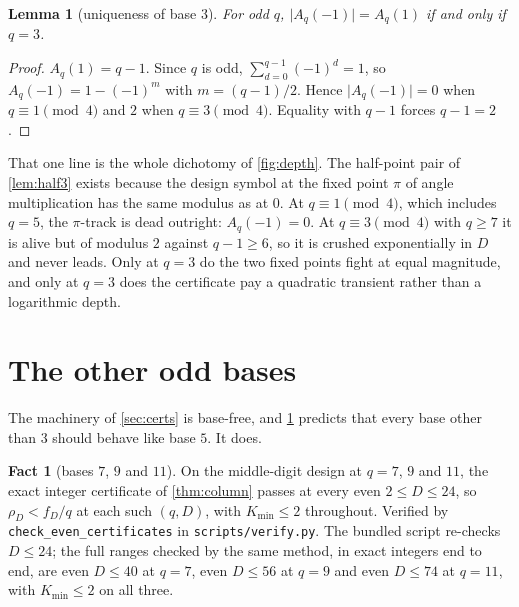 \documentclass[11pt]{amsart}
\newtheorem{lemma}[theorem]{Lemma}
\theoremstyle{definition}
\newtheorem{fact}[theorem]{Fact}
\theoremstyle{remark}
\begin{document}
\begin{lemma}[uniqueness of base $3$]
\label{lem:unique}
For odd $q$, $\lvert A_q(-1)\rvert = A_q(1)$ if and only if $q = 3$.
\end{lemma}

\begin{proof}
$A_q(1) = q-1$. Since $q$ is odd, $\sum_{d=0}^{q-1}(-1)^d = 1$, so $A_q(-1) = 1 - (-1)^m$ with $m = (q-1)/2$. Hence $\lvert A_q(-1)\rvert = 0$ when $q \equiv 1 \pmod 4$ and $2$ when $q \equiv 3 \pmod 4$. Equality with $q-1$ forces $q - 1 = 2$.
\end{proof}

That one line is the whole dichotomy of \cref{fig:depth}. The half-point pair of \cref{lem:half3} exists because the design symbol at the fixed point $\pi$ of angle multiplication has the same modulus as at $0$. At $q \equiv 1 \pmod 4$, which includes $q = 5$, the $\pi$-track is dead outright: $A_q(-1) = 0$. At $q \equiv 3 \pmod 4$ with $q \ge 7$ it is alive but of modulus $2$ against $q - 1 \ge 6$, so it is crushed exponentially in $D$ and never leads. Only at $q = 3$ do the two fixed points fight at equal magnitude, and only at $q = 3$ does the certificate pay a quadratic transient rather than a logarithmic depth.


\section{The other odd bases}
\label{sec:bases}

The machinery of \cref{sec:certs} is base-free, and \cref{lem:unique} predicts that every base other than $3$ should behave like base $5$. It does.

\begin{fact}[bases $7$, $9$ and $11$]
\label{fact:bases}
On the middle-digit design at $q = 7$, $9$ and $11$, the exact integer certificate of \cref{thm:column} passes at every even $2 \le D \le 24$, so $\rho_D < f_D/q$ at each such $(q,D)$, with $K_{\min} \le 2$ throughout. Verified by \texttt{check\_even\_certificates} in \texttt{scripts/verify.py}. The bundled script re-checks $D \le 24$; the full ranges checked by the same method, in exact integers end to end, are even $D \le 40$ at $q = 7$, even $D \le 56$ at $q = 9$ and even $D \le 74$ at $q = 11$, with $K_{\min} \le 2$ on all three.
\end{fact}
\end{document}
